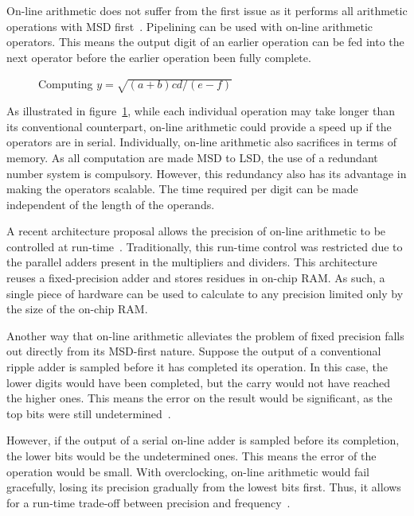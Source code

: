 On-line arithmetic does not suffer from the first issue as it performs all
arithmetic operations with MSD first~\cite{Ercegovac1}.
Pipelining can be used with on-line arithmetic operators.
This means the output digit of an earlier operation can be fed into the next
operator before the earlier operation been fully complete.

\begin{figure}[H]
  \centering
  
  \caption{Computing $y=\sqrt{(a+b)cd/(e-f)}$~\cite{Ercegovac1}}
  \label{Online}
\end{figure}

As illustrated in figure~\ref{Online}, while each individual operation may
take longer than its conventional counterpart, on-line arithmetic could provide
a speed up if the operators are in serial.
Individually, on-line arithmetic also sacrifices in terms of memory.
As all computation are made MSD to LSD, the use of a redundant number system
is compulsory.
However, this redundancy also has its advantage in making the operators
scalable.
The time required per digit can be made independent of the length of the
operands.~\cite{Trivedi1}

A recent architecture proposal allows the precision of
on-line arithmetic to be controlled at run-time~\cite{Zhao1}.
Traditionally, this run-time control was restricted due to the parallel adders
present in the multipliers and dividers.
This architecture reuses a fixed-precision adder and stores residues in
on-chip RAM.
As such, a single piece of hardware can be used to calculate to any precision
limited only by the size of the on-chip RAM.

Another way that on-line arithmetic alleviates the problem of fixed precision
falls out directly from its MSD-first nature.
Suppose the output of a conventional ripple adder is sampled before
it has completed its operation.
In this case, the lower digits would have been completed, but the carry would
not have reached the higher ones.
This means the error on the result would be significant, as the top bits
were still undetermined~\cite{Shi1}.

However, if the output of a serial on-line adder is sampled before its
completion, the lower bits would be the undetermined ones.
This means the error of the operation would be small.
With overclocking, on-line arithmetic would fail gracefully, losing its
precision gradually from the lowest bits first.
Thus, it allows for a run-time trade-off between precision and
frequency~\cite{Shi2}.

